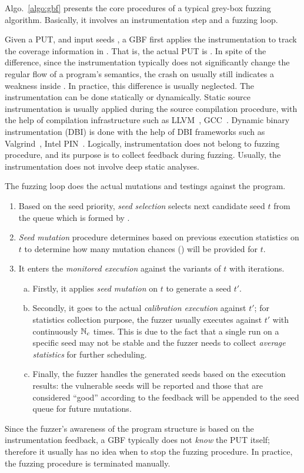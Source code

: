 Algo.~\ref{algo:gbf} presents the core procedures of a typical grey-box fuzzing algorithm. Basically, it involves an instrumentation step and a fuzzing loop.

Given a PUT, \ProgO and input seeds \Seeds, a GBF first applies the instrumentation to track the coverage information in \ProgO. That is, the actual PUT is \Prog. In spite of the difference, since the instrumentation typically does not significantly change the regular flow of a program's semantics, the crash on \Prog usually still indicates a weakness inside \ProgO. In practice, this difference is usually neglected.
The instrumentation can be done statically or dynamically. Static source instrumentation is usually applied during the source compilation procedure, with the help of compilation infrastructure such as LLVM~\cite{Lattner:2004:LCF:977395.977673}, GCC~\cite{gcc}. Dynamic binary instrumentation (DBI) is done with the help of DBI frameworks such as Valgrind~\cite{valgrind}, Intel PIN~\cite{pin}. Logically, instrumentation does not belong to fuzzing procedure, and its purpose is to collect feedback during fuzzing. Usually, the instrumentation does not involve deep static analyses.


The fuzzing loop does the actual mutations and testings against the program.
\begin{enumerate}[1.]
	\item Based on the seed priority, \emph{seed selection} selects next candidate seed $t$ from the queue which is formed by \Seeds.
	\item \emph{Seed mutation} procedure determines based on previous execution statistics on $t$ to determine how many mutation chances (\mutChance) will be provided for $t$.
	\item It enters the \emph{monitored execution} against the variants of $t$ with \mutChance iterations. 
	\begin{enumerate}[a)]
	\item Firstly, it applies \emph{seed mutation} on $t$ to generate a seed $t'$. 
	\item Secondly, it goes to the actual \emph{calibration execution} against $t'$; for statistics collection purpose, the fuzzer usually executes \Prog against $t'$ with continuously $\mathbb{N}_{c}$ times. This is due to the fact that a single run on a specific seed may not be stable and the fuzzer needs to collect \emph{average statistics} for further scheduling.
	\item Finally, the fuzzer handles the generated seeds based on the execution results: the vulnerable seeds will be reported and those that are considered ``good'' according to the feedback will be appended to the seed queue for future mutations.
	\end{enumerate}
\end{enumerate}
Since the fuzzer's awareness of the program structure is based on the instrumentation feedback, a GBF typically does not \emph{know} the PUT itself; therefore it usually has no idea when to stop the fuzzing procedure. In practice, the fuzzing procedure is terminated manually.


